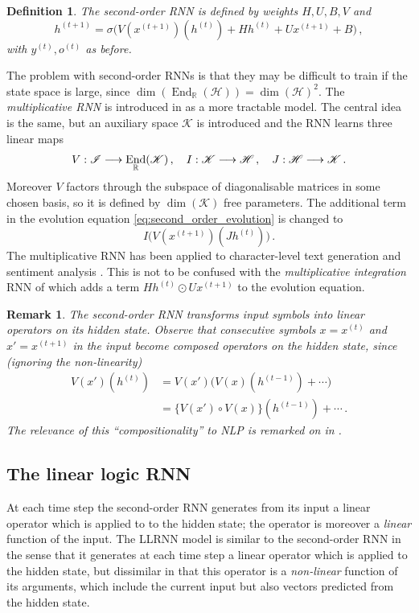 \documentclass[english,letter paper,12pt,leqno]{article}
\theoremstyle{example}
\newtheorem{definition}[theorem]{Definition}
\newtheorem{remark}[theorem]{Remark}
\numberwithin{equation}{section}
\def\be{\begin{equation}}
\def\ee{\end{equation}}
\DeclareMathOperator{\End}{End}
\begin{document}
\begin{definition} The second-order RNN \cite{highorderrec,pollack} is defined by weights $H,U,B,V$ and
\be\label{eq:second_order_evolution}
h^{(t+1)} = \sigma\big( V( x^{(t+1)} )(h^{(t)}) + H h^{(t)} + U x^{(t+1)} + B\big)\,,
\ee 
with $y^{(t)}, o^{(t)}$ as before.
\end{definition}

The problem with second-order RNNs is that they may be difficult to train if the state space is large, since $\dim(\End_{\mathbb{R}}(\mathscr{H})) = \dim(\mathscr{H})^2$. The \emph{multiplicative RNN} is introduced in \cite{sutskever} as a more tractable model. The central idea is the same, but an auxiliary space $\mathscr{K}$ is introduced and the RNN learns three linear maps
\be\label{eq:threelinearmaps}
V: \mathscr{I} \lto \End_{\mathbb{R}}(\mathscr{K})\,, \quad I: \mathscr{K} \lto \mathscr{H}\,, \quad J: \mathscr{H} \lto \mathscr{K}\,.
\ee
Moreover $V$ factors through the subspace of diagonalisable matrices in some chosen basis, so it is defined by $\dim(\mathscr{K})$ free parameters. The additional term in the evolution equation \eqref{eq:second_order_evolution} is changed to
\be\label{eq:new_term_mRNN}
I\big( V(x^{(t+1)})( J h^{(t)} ) \big)\,.
\ee
The multiplicative RNN has been applied to character-level text generation \cite{sutskever} and sentiment analysis \cite{irsoy}. This is not to be confused with the \emph{multiplicative integration} RNN of \cite{yuhai} which adds a term $H h^{(t)} \odot U x^{(t+1)}$ to the evolution equation.

\begin{remark}
The second-order RNN transforms input symbols into linear operators on its hidden state. Observe that consecutive symbols $x = x^{(t)}$ and $x' = x^{(t+1)}$ in the input become composed operators on the hidden state, since (ignoring the non-linearity)
\begin{align*}
V(x')(h^{(t)}) &= V(x')\big( V(x)(h^{(t-1)}) + \cdots)\\
&= \big\{ V(x') \circ V(x) \big\}( h^{(t-1)} ) + \cdots\,.
\end{align*}
The relevance of this ``compositionality'' to NLP is remarked on in \cite{irsoy}.
\end{remark}


\subsection{The linear logic RNN}

At each time step the second-order RNN generates from its input a linear operator which is applied to to the hidden state; the operator is moreover a \emph{linear} function of the input. The LLRNN model is similar to the second-order RNN in the sense that it generates at each time step a linear operator which is applied to the hidden state, but dissimilar in that this operator is a \emph{non-linear} function of its arguments, which include the current input but also vectors predicted from the hidden state.
\end{document}
